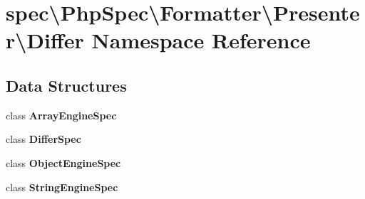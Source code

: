 \section{spec\textbackslash{}Php\+Spec\textbackslash{}Formatter\textbackslash{}Presenter\textbackslash{}Differ Namespace Reference}
\label{namespacespec_1_1_php_spec_1_1_formatter_1_1_presenter_1_1_differ}
\subsection*{Data Structures}
\begin{DoxyCompactItemize}
\item 
class {\bf Array\+Engine\+Spec}
\item 
class {\bf Differ\+Spec}
\item 
class {\bf Object\+Engine\+Spec}
\item 
class {\bf String\+Engine\+Spec}
\end{DoxyCompactItemize}
